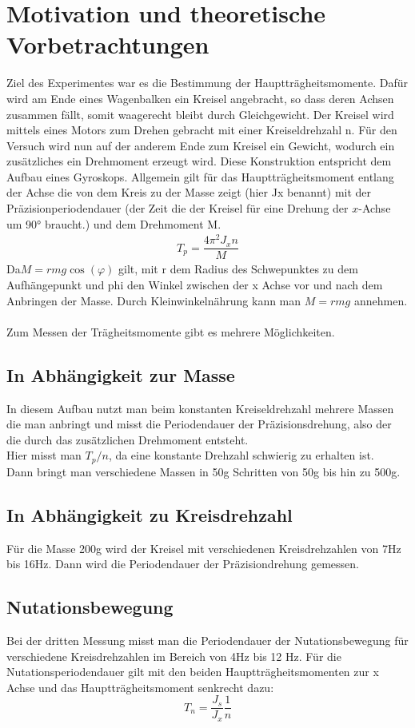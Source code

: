 \documentclass[bibliography=totocnumbered]{scrartcl}
\begin{document}
	\section{Motivation und theoretische Vorbetrachtungen}
Ziel des Experimentes war es die Bestimmung der Hauptträgheitsmomente.
Dafür wird am Ende eines Wagenbalken ein Kreisel angebracht, so dass deren Achsen zusammen fällt, somit waagerecht bleibt durch Gleichgewicht. Der Kreisel wird mittels eines Motors zum Drehen gebracht mit einer Kreiseldrehzahl n.
Für den Versuch wird nun auf der anderem Ende zum Kreisel ein Gewicht, wodurch ein zusätzliches ein Drehmoment erzeugt wird.
Diese Konstruktion entspricht dem Aufbau eines Gyroskops.
Allgemein gilt für das Hauptträgheitsmoment entlang der Achse die von dem Kreis zu der Masse zeigt (hier Jx benannt) mit der Präzisionperiodendauer (der Zeit die der Kreisel für eine Drehung der $ x $-Achse um 90° braucht.) und dem Drehmoment M.
\begin{align}\label{eq: Tp}
	T_{p}=\dfrac{4\pi^{2}J_{x}n}{M}
\end{align}
	Da$  M=r m g \cos(\varphi) $ gilt, mit r dem Radius des Schwepunktes zu dem Aufhängepunkt und phi den Winkel zwischen der x Achse vor und nach dem Anbringen der Masse. Durch Kleinwinkelnährung kann man $ M=rmg $ annehmen.\\\\
	Zum Messen der Trägheitsmomente gibt es mehrere Möglichkeiten.
	\subsection{In Abhängigkeit zur Masse}
	In diesem Aufbau nutzt man beim konstanten Kreiseldrehzahl mehrere Massen die man anbringt und misst die Periodendauer der Präzisionsdrehung, also der die durch das zusätzlichen Drehmoment entsteht.\\
	Hier misst man $ T_{p}/n $, da eine konstante Drehzahl schwierig zu erhalten ist.\\
	Dann bringt man verschiedene Massen in 50g Schritten von 50g bis hin zu 500g.
	
	\subsection{In Abhängigkeit zu Kreisdrehzahl}
	Für die Masse 200g wird der Kreisel mit verschiedenen Kreisdrehzahlen von 7Hz bis 16Hz.
	Dann wird die Periodendauer der Präzisiondrehung gemessen.
	
	\subsection{Nutationsbewegung}
	Bei der dritten Messung misst man die Periodendauer der Nutationsbewegung für verschiedene Kreisdrehzahlen im Bereich von 4Hz bis 12 Hz.
	Für die Nutationsperiodendauer gilt mit den beiden Hauptträgheitsmomenten zur x Achse und das Hauptträgheitsmoment senkrecht dazu:
	\begin{equation}\label{eq: Nutation}
		T_{n}=\dfrac{J_{s}}{J_{x}}\dfrac{1}{n}
	\end{equation}
	
\end{document}
